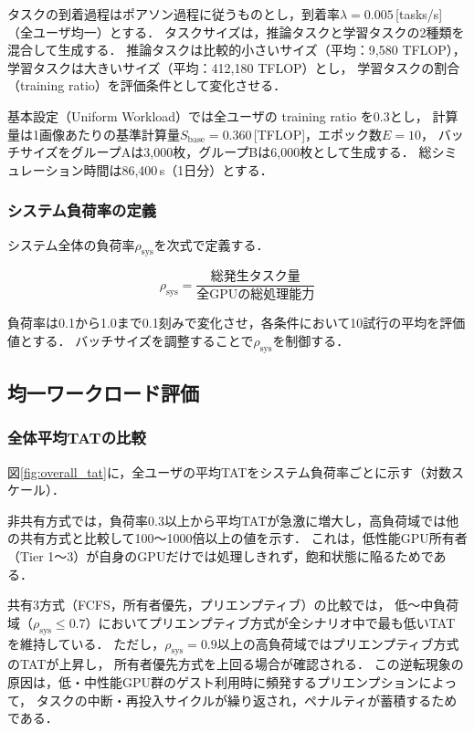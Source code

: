 \documentclass[12pt,a4paper]{jsarticle}
\begin{document}
タスクの到着過程はポアソン過程に従うものとし，到着率$\lambda = 0.005$\,[tasks/s]（全ユーザ均一）とする．
タスクサイズは，推論タスクと学習タスクの2種類を混合して生成する．
推論タスクは比較的小さいサイズ（平均：9{,}580 TFLOP），学習タスクは大きいサイズ（平均：412{,}180 TFLOP）とし，
学習タスクの割合（training ratio）を評価条件として変化させる．

基本設定（Uniform Workload）では全ユーザの training ratio を0.3とし，
計算量は1画像あたりの基準計算量$S_\mathrm{base} = 0.360$\,[TFLOP]，エポック数$E = 10$，
バッチサイズをグループAは3{,}000枚，グループBは6{,}000枚として生成する．
総シミュレーション時間は86{,}400\,s（1日分）とする．

\subsubsection{システム負荷率の定義}

システム全体の負荷率$\rho_\mathrm{sys}$を次式で定義する．

\begin{equation}
  \rho_\mathrm{sys} = \frac{\text{総発生タスク量}}{\text{全GPUの総処理能力}}
  \label{eq:sys_load}
\end{equation}

負荷率は0.1から1.0まで0.1刻みで変化させ，各条件において10試行の平均を評価値とする．
バッチサイズを調整することで$\rho_\mathrm{sys}$を制御する．

\subsection{均一ワークロード評価}

\subsubsection{全体平均TATの比較}

図\ref{fig:overall_tat}に，全ユーザの平均TATをシステム負荷率ごとに示す（対数スケール）．

非共有方式では，負荷率0.3以上から平均TATが急激に増大し，高負荷域では他の共有方式と比較して100〜1000倍以上の値を示す．
これは，低性能GPU所有者（Tier 1〜3）が自身のGPUだけでは処理しきれず，飽和状態に陥るためである．

共有3方式（FCFS，所有者優先，プリエンプティブ）の比較では，
低〜中負荷域（$\rho_\mathrm{sys} \leq 0.7$）においてプリエンプティブ方式が全シナリオ中で最も低いTATを維持している．
ただし，$\rho_\mathrm{sys} = 0.9$以上の高負荷域ではプリエンプティブ方式のTATが上昇し，
所有者優先方式を上回る場合が確認される．
この逆転現象の原因は，低・中性能GPU群のゲスト利用時に頻発するプリエンプションによって，
タスクの中断・再投入サイクルが繰り返され，ペナルティが蓄積するためである．
\end{document}
